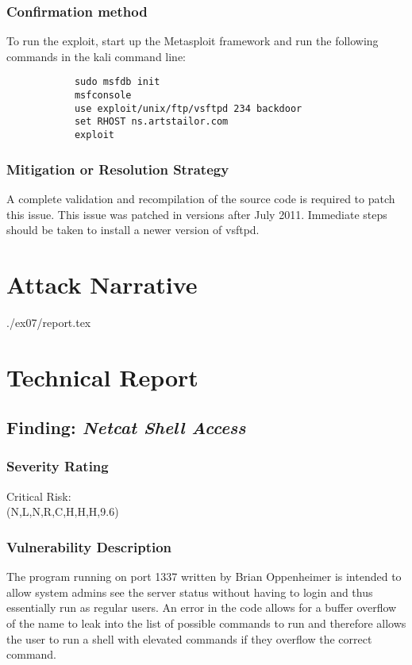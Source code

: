   	\subsubsection*{Confirmation method}
  	    To run the exploit, start up the Metasploit framework and run the following commands in the kali command line:
        \begin{verbatim}
            sudo msfdb init
            msfconsole
            use exploit/unix/ftp/vsftpd 234 backdoor
            set RHOST ns.artstailor.com
            exploit
        \end{verbatim}

    \subsubsection*{Mitigation or Resolution Strategy}
        A complete validation and recompilation of the source code is required to patch this issue. This
        issue was patched in versions after July 2011. Immediate steps should be taken to install a newer version
        of vsftpd.

\section{Attack Narrative}
./ex07/report.tex

\section{Technical Report}


  \subsection{Finding: \emph{Netcat Shell Access}}
  
	\subsubsection*{Severity Rating}
		Critical Risk: \\
		\cvss(N,L,N,R,C,H,H,H,9.6)
		
  	\subsubsection*{Vulnerability Description}
  		The program running on port 1337 written by Brian Oppenheimer is intended to allow system admins see the server status without having to login and
        thus essentially run as regular users. An error in the code allows for a buffer overflow of the name to leak into the list of possible commands to run
        and therefore allows the user to run a shell with elevated commands if they overflow the correct command. 
